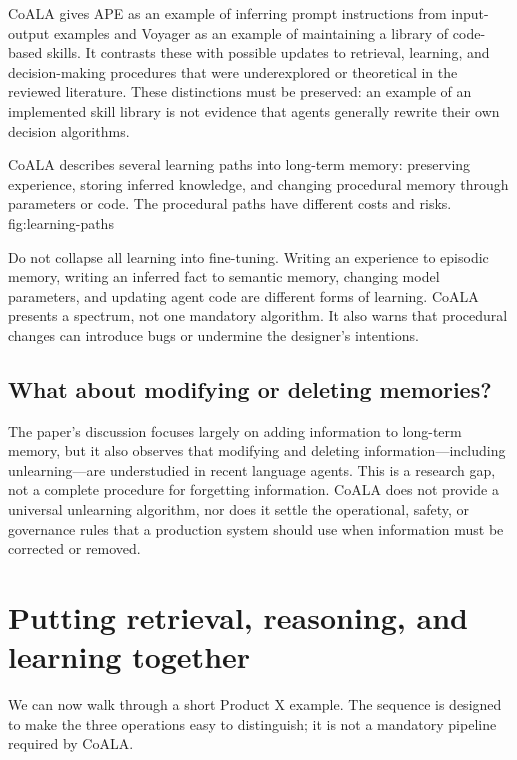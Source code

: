 CoALA gives APE as an example of inferring prompt instructions from input-output examples and Voyager as an example of maintaining a library of code-based skills. It contrasts these with possible updates to retrieval, learning, and decision-making procedures that were underexplored or theoretical in the reviewed literature. These distinctions must be preserved: an example of an implemented skill library is not evidence that agents generally rewrite their own decision algorithms.

  {CoALA describes several learning paths into long-term memory: preserving experience, storing inferred knowledge, and changing procedural memory through parameters or code. The procedural paths have different costs and risks.}
  {fig:learning-paths}

\begin{warningbox}
Do not collapse all learning into fine-tuning. Writing an experience to episodic memory, writing an inferred fact to semantic memory, changing model parameters, and updating agent code are different forms of learning. CoALA presents a spectrum, not one mandatory algorithm. It also warns that procedural changes can introduce bugs or undermine the designer's intentions.
\end{warningbox}

\subsection{What about modifying or deleting memories?}

The paper's discussion focuses largely on adding information to long-term memory, but it also observes that modifying and deleting information---including unlearning---are understudied in recent language agents. This is a research gap, not a complete procedure for forgetting information. CoALA does not provide a universal unlearning algorithm, nor does it settle the operational, safety, or governance rules that a production system should use when information must be corrected or removed.

\section{Putting retrieval, reasoning, and learning together}
\label{sec:internal-actions-together}

We can now walk through a short Product X example. The sequence is designed to make the three operations easy to distinguish; it is not a mandatory pipeline required by CoALA.

